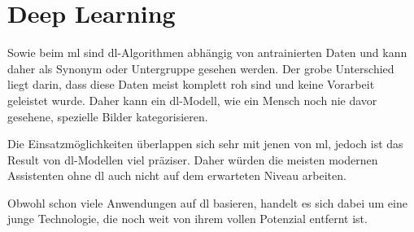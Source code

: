 \section{Deep Learning}

Sowie beim \gls{ml} sind \gls{dl}-Algorithmen abhängig von antrainierten Daten und kann daher als Synonym oder Untergruppe gesehen werden. Der grobe Unterschied liegt darin, dass diese Daten meist komplett roh sind und keine Vorarbeit geleistet wurde. Daher kann ein \gls{dl}-Modell, wie ein Mensch noch nie davor gesehene, spezielle Bilder kategorisieren. 

Die Einsatzmöglichkeiten überlappen sich sehr mit jenen von \gls{ml}, jedoch ist das Result von \gls{dl}-Modellen viel präziser. Daher würden die meisten modernen Assistenten ohne \gls{dl} auch nicht auf dem erwarteten Niveau arbeiten. 

Obwohl schon viele Anwendungen auf \Gls{dl} basieren, handelt es sich dabei um eine junge Technologie, die noch weit von ihrem vollen Potenzial entfernt ist.
